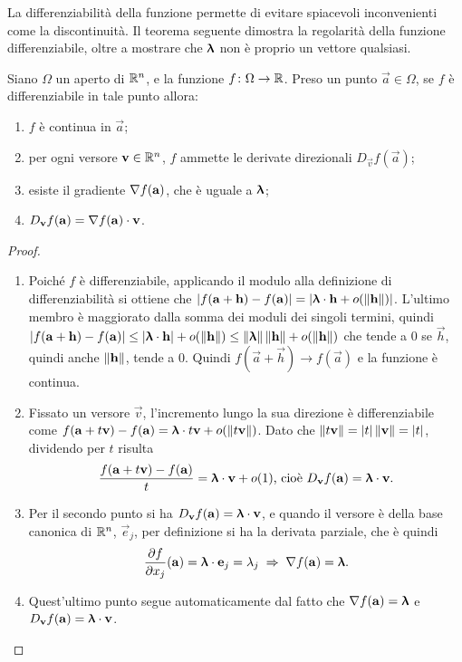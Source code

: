 La differenziabilità della funzione permette di evitare spiacevoli inconvenienti come la discontinuità. Il teorema seguente dimostra la regolarità della funzione differenziabile, oltre a mostrare che $\bm{\uplambda}$ non è proprio un vettore qualsiasi.
\begin{teorema} \label{t:conseguenze_differenziabilita}
Siano $\Omega$ un aperto di $\mathbb{R}^n$, e la funzione $f\colon\Omega\to\mathbb{R}$. Preso un punto $\vec a\in\Omega$, se $f$ è differenziabile in tale punto allora:
\begin{enumerate}
\item $f$ è continua in $\vec a$;
\item per ogni versore $\mathbf{v}\in\mathbb{R}^n$, $f$ ammette le derivate direzionali $D_{\vec v}f(\vec a)$;
\item esiste il gradiente $\nabla f(\mathbf{a})$, che è uguale a $\bm{\uplambda}$;
\item $D_{\mathbf{v}}f(\mathbf{a})={\nabla f(\mathbf{a})}\cdot{\mathbf{v}}$.
\end{enumerate}
\end{teorema}
\begin{proof}
\begin{enumerate}
\item Poiché $f$ è differenziabile, applicando il modulo alla definizione di differenziabilità si ottiene che $\left|{f(\mathbf{a}+\mathbf{h})-f(\mathbf{a})}\right|=\left|{{\bm{\uplambda}}\cdot{\mathbf{h}}+o(\left\|{\mathbf{h}}\right\|)}\right|$. L'ultimo membro è maggiorato dalla somma dei moduli dei singoli termini, quindi $\left|{f(\mathbf{a}+\mathbf{h})-f(\mathbf{a})}\right|\leq\left|{{\bm{\uplambda}}\cdot{\mathbf{h}}}\right|+o(\left\|{\mathbf{h}}\right\|)\leq\left\|{\bm{\uplambda}}\right\|\left\|{\mathbf{h}}\right\|+o(\left\|{\mathbf{h}}\right\|)$ che tende a 0 se $\vec h$, quindi anche $\left\|{\mathbf{h}}\right\|$, tende a 0. Quindi $f(\vec a+\vec h)\to f(\vec a)$ e la funzione è continua.
\item Fissato un versore $\vec v$, l'incremento lungo la sua direzione è differenziabile come $f(\mathbf{a}+t\mathbf{v})-f(\mathbf{a})={\bm{\uplambda}}\cdot{t\mathbf{v}}+o(\left\|{t\mathbf{v}}\right\|)$. Dato che $\left\|{t\mathbf{v}}\right\|=\left|{t}\right|\left\|{\mathbf{v}}\right\|=\left|{t}\right|$, dividendo per $t$ risulta
\[
\frac{f(\mathbf{a}+t\mathbf{v})-f(\mathbf{a})}{t}={\bm{\uplambda}}\cdot{\mathbf{v}}+o(1)\text{, cioè }D_{\mathbf{v}}f(\mathbf{a})={\bm{\uplambda}}\cdot{\mathbf{v}}.
\]
\item Per il secondo punto si ha $D_{\mathbf{v}}f(\mathbf{a})={\bm{\uplambda}}\cdot{\mathbf{v}}$, e quando il versore è della base canonica di $\mathbb{R}^n$, $\vec e_j$, per definizione si ha la derivata parziale, che è quindi
\[
\frac{\partial {f}}{\partial {x_j}}(\mathbf{a})={\bm{\uplambda}}\cdot{\mathbf{e}_j}=\lambda_j\;\Rightarrow\;\nabla f(\mathbf{a})=\bm{\uplambda}.
\]
\item Quest'ultimo punto segue automaticamente dal fatto che $\nabla f(\mathbf{a})=\bm{\uplambda}$ e $D_{\mathbf{v}}f(\mathbf{a})={\bm{\uplambda}}\cdot{\mathbf{v}}$.\qedhere
\end{enumerate}
\end{proof}
